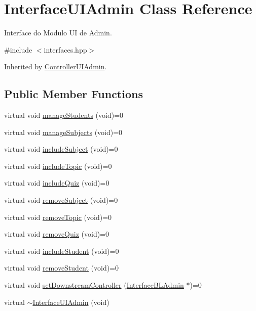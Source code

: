 \hypertarget{class_interface_u_i_admin}{}\section{Interface\+U\+I\+Admin Class Reference}
\label{class_interface_u_i_admin}


Interface do Modulo UI de Admin.  




{\ttfamily \#include $<$interfaces.\+hpp$>$}



Inherited by \hyperlink{class_controller_u_i_admin}{Controller\+U\+I\+Admin}.

\subsection*{Public Member Functions}
\begin{DoxyCompactItemize}
\item 
virtual void \hyperlink{class_interface_u_i_admin_a4cfdde0e6b96ced849e26c75c7de2077}{manage\+Students} (void)=0
\item 
virtual void \hyperlink{class_interface_u_i_admin_ac5c6b8b3eb80b5f5d401b711da4ecc58}{manage\+Subjects} (void)=0
\item 
virtual void \hyperlink{class_interface_u_i_admin_aeb5d10fa8f9633ed73e52bb61d10f40a}{include\+Subject} (void)=0
\item 
virtual void \hyperlink{class_interface_u_i_admin_a819252ab207a578d42807db748f867cd}{include\+Topic} (void)=0
\item 
virtual void \hyperlink{class_interface_u_i_admin_a7a7964eb3ed3e6d4825d783433c9c7f1}{include\+Quiz} (void)=0
\item 
virtual void \hyperlink{class_interface_u_i_admin_a812a7f43e1daaf95525e7c8b2b11676d}{remove\+Subject} (void)=0
\item 
virtual void \hyperlink{class_interface_u_i_admin_a93530a289e1c659eaa12a8261f4d304e}{remove\+Topic} (void)=0
\item 
virtual void \hyperlink{class_interface_u_i_admin_ae092dea900f7b2bc57cbf82b665df0ce}{remove\+Quiz} (void)=0
\item 
virtual void \hyperlink{class_interface_u_i_admin_a1fe189d6258d112e4165f69f5326752d}{include\+Student} (void)=0
\item 
virtual void \hyperlink{class_interface_u_i_admin_af9fdde1936eaa0bf7950c4ca98d44d74}{remove\+Student} (void)=0
\item 
virtual void \hyperlink{class_interface_u_i_admin_a4c663ca0610288ba4ac5b8f772454cfc}{set\+Downstream\+Controller} (\hyperlink{class_interface_b_l_admin}{Interface\+B\+L\+Admin} $\ast$)=0
\item 
virtual \hyperlink{class_interface_u_i_admin_aa2a6ef48ec075bfa3ba5006ac6c1dfe9}{$\sim$\+Interface\+U\+I\+Admin} (void)
\end{DoxyCompactItemize}



